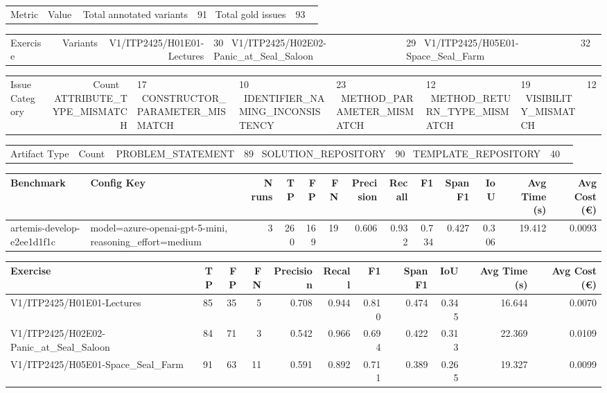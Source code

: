 \begin{tabular}{lr}
Metric & Value \
\hline
Total annotated variants & 91 \
Total gold issues & 93 \
\end{tabular}

\begin{tabular}{lr}
Exercise & Variants \
\hline
V1/ITP2425/H01E01-Lectures & 30 \
V1/ITP2425/H02E02-Panic\_at\_Seal\_Saloon & 29 \
V1/ITP2425/H05E01-Space\_Seal\_Farm & 32 \
\end{tabular}

\begin{tabular}{lr}
Issue Category & Count \
\hline
ATTRIBUTE\_TYPE\_MISMATCH & 17 \
CONSTRUCTOR\_PARAMETER\_MISMATCH & 10 \
IDENTIFIER\_NAMING\_INCONSISTENCY & 23 \
METHOD\_PARAMETER\_MISMATCH & 12 \
METHOD\_RETURN\_TYPE\_MISMATCH & 19 \
VISIBILITY\_MISMATCH & 12 \
\end{tabular}

\begin{tabular}{lr}
Artifact Type & Count \
\hline
PROBLEM\_STATEMENT & 89 \
SOLUTION\_REPOSITORY & 90 \
TEMPLATE\_REPOSITORY & 40 \
\end{tabular}

\begin{tabular}{llrrrrrrrrrrr}
Benchmark & Config Key & N runs & TP & FP & FN & Precision & Recall & F1 & Span F1 & IoU & Avg Time (s) & Avg Cost (€) \\
\hline
artemis-develop-e2ee1d1f1c & model=azure-openai-gpt-5-mini, reasoning\_effort=medium & 3 & 260 & 169 & 19 & 0.606 & 0.932 & 0.734 & 0.427 & 0.306 & 19.412 & 0.0093 \\
\end{tabular}

\begin{tabular}{lrrrrrrrrrr}
Exercise & TP & FP & FN & Precision & Recall & F1 & Span F1 & IoU & Avg Time (s) & Avg Cost (€) \\
\hline
V1/ITP2425/H01E01-Lectures & 85 & 35 & 5 & 0.708 & 0.944 & 0.810 & 0.474 & 0.345 & 16.644 & 0.0070 \\
V1/ITP2425/H02E02-Panic\_at\_Seal\_Saloon & 84 & 71 & 3 & 0.542 & 0.966 & 0.694 & 0.422 & 0.313 & 22.369 & 0.0109 \\
V1/ITP2425/H05E01-Space\_Seal\_Farm & 91 & 63 & 11 & 0.591 & 0.892 & 0.711 & 0.389 & 0.265 & 19.327 & 0.0099 \\
\end{tabular}
